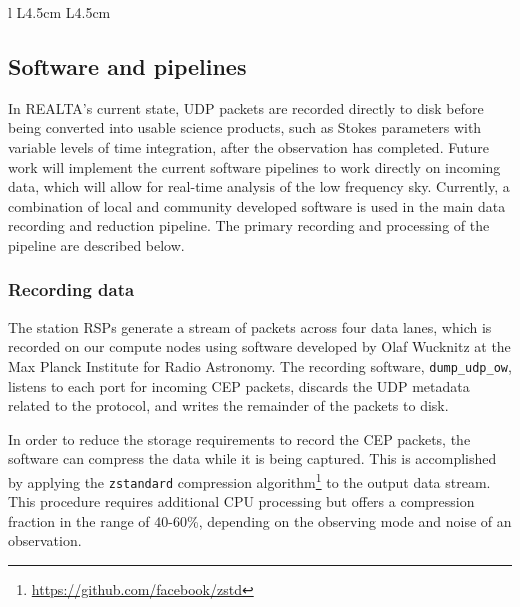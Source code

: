 \begin{table*}
\begin{tabular}{l L{4.5cm} L{4.5cm}}
\end{tabular}

\caption[Table of hardware specifications for REALTA.]{Table of hardware specifications for REALTA. Note that the specifications are given for individual UCC 1-4 compute nodes, except for storage which is the total amount dedicated to archival of data distributed across all four. }
\label{table:REALTAspecs}
\end{table*}

\subsection{Software and pipelines}
\label{sec:softwareAndProcessing}
In REALTA's current state, UDP packets are recorded directly to disk before being converted into usable science products, such as Stokes parameters with variable levels of time integration, after the observation has completed. Future work will implement the current software pipelines to work directly on incoming data, which will allow for real-time analysis of the low frequency sky. Currently, a combination of local and community developed software is used in the main data recording and reduction pipeline. The primary recording and processing of the pipeline are described below.

\subsubsection{Recording data}
\label{sec:preproc}
The station RSPs generate a stream of packets across four data lanes, which is recorded on our compute nodes using software developed by Olaf Wucknitz at the Max Planck Institute for Radio Astronomy. The recording software, \texttt{dump\_udp\_ow}, listens to each port for incoming CEP packets, discards the UDP metadata related to the protocol, and writes the remainder of the packets to disk.

In order to reduce the storage requirements to record the CEP packets, the software can compress the data while it is being captured. This is accomplished by applying the \texttt{zstandard} compression algorithm\footnote{\hyperref[zstandard]{https://github.com/facebook/zstd}} to the output data stream. This procedure requires additional CPU processing but offers a compression fraction in the range of 40-60\%, depending on the observing mode and noise of an observation.

